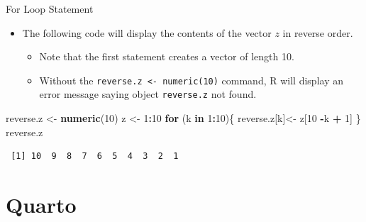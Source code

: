 \documentclass[
  ignorenonframetext,
]{beamer}
\newenvironment{Shaded}{\begin{snugshade}}{\end{snugshade}}
\newcommand{\ControlFlowTok}[1]{\textcolor[rgb]{0.13,0.29,0.53}{\textbf{#1}}}
\newcommand{\DecValTok}[1]{\textcolor[rgb]{0.00,0.00,0.81}{#1}}
\newcommand{\FunctionTok}[1]{\textcolor[rgb]{0.13,0.29,0.53}{\textbf{#1}}}
\newcommand{\NormalTok}[1]{#1}
\newcommand{\OtherTok}[1]{\textcolor[rgb]{0.56,0.35,0.01}{#1}}
\newcommand{\SpecialCharTok}[1]{\textcolor[rgb]{0.81,0.36,0.00}{\textbf{#1}}}
\providecommand{\tightlist}{%
  \setlength{\itemsep}{0pt}\setlength{\parskip}{0pt}}
\begin{document}
\begin{frame}[fragile]{For Loop Statement}
\protect\hypertarget{for-loop-statement-2}{}
\begin{itemize}
\item
  The following code will display the contents of the vector \(z\) in
  reverse order.

  \begin{itemize}
  \tightlist
  \item
    Note that the first statement creates a vector of length 10.
  \item
    Without the \texttt{reverse.z\ \textless{}-\ numeric(10)} command, R
    will display an error message saying object \texttt{reverse.z} not
    found.
  \end{itemize}
\end{itemize}

\small

\begin{Shaded}
\begin{Highlighting}[]
\NormalTok{reverse.z }\OtherTok{\textless{}{-}} \FunctionTok{numeric}\NormalTok{(}\DecValTok{10}\NormalTok{)}
\NormalTok{z }\OtherTok{\textless{}{-}} \DecValTok{1}\SpecialCharTok{:}\DecValTok{10}
\ControlFlowTok{for}\NormalTok{ (k }\ControlFlowTok{in} \DecValTok{1}\SpecialCharTok{:}\DecValTok{10}\NormalTok{)\{}
\NormalTok{  reverse.z[k]}\OtherTok{\textless{}{-}}\NormalTok{ z[}\DecValTok{10} \SpecialCharTok{{-}}\NormalTok{k }\SpecialCharTok{+} \DecValTok{1}\NormalTok{]}
\NormalTok{\}}
\NormalTok{reverse.z}
\end{Highlighting}
\end{Shaded}

\begin{verbatim}
 [1] 10  9  8  7  6  5  4  3  2  1
\end{verbatim}

\normalsize
\end{frame}

\hypertarget{quarto}{%
\section{Quarto}\label{quarto}}
\end{document}
